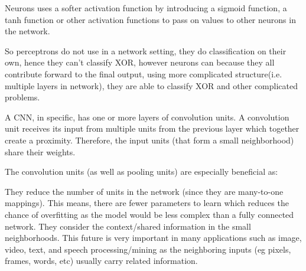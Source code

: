 \documentclass[a4paper]{article}
\begin{document}
Neurons uses a softer activation function by introducing a sigmoid function, a tanh function or other activation functions to pass on values to other neurons in the network.

So perceptrons do not use in a network setting, they do classification on their own, hence they can’t classify XOR, however neurons can because they all contribute forward to the final output, using more complicated structure(i.e. multiple layers in network), they are able to classify XOR and other complicated problems.

A CNN, in specific, has one or more layers of convolution units. A convolution unit receives its input from multiple units from the previous layer which together create a proximity. Therefore, the input units (that form a small neighborhood) share their weights.

The convolution units (as well as pooling units) are especially beneficial as:

They reduce the number of units in the network (since they are many-to-one mappings). This means, there are fewer parameters to learn which reduces the chance of overfitting as the model would be less complex than a fully connected network.
They consider the context/shared information in the small neighborhoods. This future is very important in many applications such as image, video, text, and speech processing/mining as the neighboring inputs (eg pixels, frames, words, etc) usually carry related information.
\end{document}
